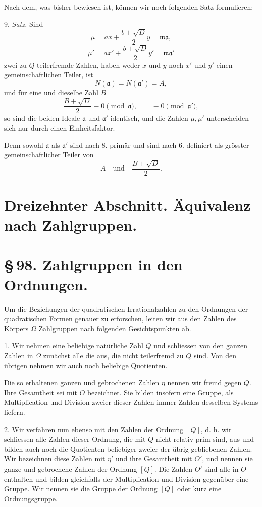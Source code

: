 \documentclass[11pt]{article}
\begin{document}
Nach dem, was bisher bewiesen ist, können wir noch folgenden Satz formulieren:

9. \emph{Satz.} Sind
\[
 \mu=ax+\frac{b+\sqrt D}{2}y=\mathfrak m\mathfrak a,
\]
\[
 \mu'=ax'+\frac{b+\sqrt D}{2}y'=\mathfrak m\mathfrak a'
\]
zwei zu $Q$ teilerfremde Zahlen, haben weder $x$ und $y$ noch $x'$ und $y'$ einen gemeinschaftlichen Teiler, ist
\[
 N(\mathfrak a)=N(\mathfrak a')=A,
\]
und für eine und dieselbe Zahl $B$
\[
 \frac{B+\sqrt D}{2}\equiv0\pmod{\mathfrak a},
 \qquad
 \equiv0\pmod{\mathfrak a'},
\]
so sind die beiden Ideale $\mathfrak a$ und $\mathfrak a'$ identisch, und die Zahlen $\mu,\mu'$ unterscheiden sich nur durch einen Einheitsfaktor.

Denn sowohl $\mathfrak a$ als $\mathfrak a'$ sind nach 8. primär und sind nach 6. definiert als grösster gemeinschaftlicher Teiler von
\[
 A\quad\text{und}\quad \frac{B+\sqrt D}{2}.
\]

\section*{Dreizehnter Abschnitt. Äquivalenz nach Zahlgruppen.}

\section*{\S\,98. Zahlgruppen in den Ordnungen.}

Um die Beziehungen der quadratischen Irrationalzahlen zu den Ordnungen der quadratischen Formen genauer zu erforschen, leiten wir aus den Zahlen des Körpers $\Omega$ Zahlgruppen nach folgenden Gesichtspunkten ab.

1. Wir nehmen eine beliebige natürliche Zahl $Q$ und schliessen von den ganzen Zahlen in $\Omega$ zunächst alle die aus, die nicht teilerfremd zu $Q$ sind. Von den übrigen nehmen wir auch noch beliebige Quotienten.

Die so erhaltenen ganzen und gebrochenen Zahlen $\eta$ nennen wir fremd gegen $Q$. Ihre Gesamtheit sei mit $O$ bezeichnet. Sie bilden insofern eine Gruppe, als Multiplication und Division zweier dieser Zahlen immer Zahlen desselben Systems liefern.

2. Wir verfahren nun ebenso mit den Zahlen der Ordnung $[Q]$, d. h. wir schliessen alle Zahlen dieser Ordnung, die mit $Q$ nicht relativ prim sind, aus und bilden auch noch die Quotienten beliebiger zweier der übrig gebliebenen Zahlen. Wir bezeichnen diese Zahlen mit $\eta'$ und ihre Gesamtheit mit $O'$, und nennen sie ganze und gebrochene Zahlen der Ordnung $[Q]$. Die Zahlen $O'$ sind alle in $O$ enthalten und bilden gleichfalls der Multiplication und Division gegenüber eine Gruppe. Wir nennen sie die Gruppe der Ordnung $[Q]$ oder kurz eine Ordnungsgruppe.
\end{document}
